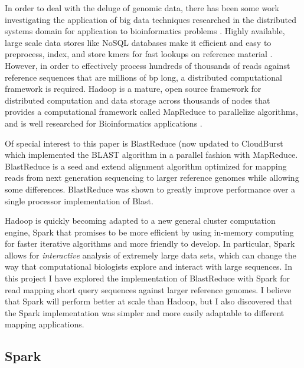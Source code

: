 \documentclass[conference,letterpaper,11pt]{IEEEtran}
\begin{document}
    In order to deal with the deluge of genomic data, there has been some work investigating the application of big data techniques researched in the distributed systems domain for application to bioinformatics problems \cite{taylor_overview_2010}. Highly available, large scale data stores like NoSQL databases make it efficient and easy to preprocess, index, and store kmers for fast lookups on reference material \cite{menon_rapid_2011,qiu_cloud_2009}. However, in order to effectively process hundreds of thousands of reads against reference sequences that are millions of bp long, a distributed computational framework is required. Hadoop \cite{dean_mapreduce_2008} is a mature, open source framework for distributed computation and data storage across thousands of nodes that provides a computational framework called MapReduce to parallelize algorithms, and is well researched for Bioinformatics applications \cite{leo_biodoop_2009,niemenmaa_hadoop_bam_2012,li_hadoop_2012}. 
    
    Of special interest to this paper is BlastReduce \cite{schatz_blastreduce_2008} (now updated to CloudBurst \cite{schatz_cloudburst_2009} which implemented the BLAST \cite{altschul_basic_1990} algorithm in a parallel fashion with MapReduce. BlastReduce is a seed and extend alignment algorithm optimized for mapping reads from next generation sequencing to larger reference genomes while allowing some differences. BlastReduce was shown to greatly improve performance over a single processor implementation of Blast. 
    
    Hadoop is quickly becoming adapted to a new general cluster computation engine, Spark \cite{zaharia_spark_2010} that promises to be more efficient by using in-memory computing for faster iterative algorithms and more friendly to develop. In particular, Spark allows for \textit{interactive} analysis of extremely large data sets, which can change the way that computational biologists explore and interact with large sequences. In this project I have explored the implementation of BlastReduce with Spark for read mapping short query sequences against larger reference genomes. I believe that Spark will perform better at scale than Hadoop, but I also discovered that the Spark implementation was simpler and more easily adaptable to different mapping applications.
    
\subsection{Spark}    
    
\end{document}
